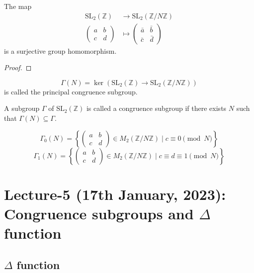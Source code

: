 \documentclass[oneside, 12pt]{scrbook}
\newcommand{\ZZ}{\mathbb Z}
\theoremstyle{theorem}
\begin{document}
\begin{lemma}
The map 
\begin{align*}
\mathrm{SL}_{2}(\ZZ) &\rightarrow \mathrm{SL}_{2}(\ZZ / N \ZZ) \\
\begin{pmatrix}
a & b \\ c & d
\end{pmatrix}  &\mapsto \begin{pmatrix}
\bar{a} & \bar{b} \\ \bar{c} & \bar{d}
\end{pmatrix}
\end{align*}
is a surjective group homomorphism.
\end{lemma}

\begin{proof}

\end{proof}

\begin{definition}
$$\Gamma (N) = \ker (\mathrm{SL}_{2}(\ZZ) \rightarrow \mathrm{SL}_{2}(\ZZ / N \ZZ))$$ is called the principal congruence subgroup.
\end{definition}

\begin{definition}
A subgroup $\Gamma$ of $\mathrm{SL}_{2}(\ZZ)$ is called a congruence subgroup if there exists $N$ such that $\Gamma (N) \subseteq \Gamma$.
\end{definition}

$$\Gamma_{0}(N) =\left\{ \begin{pmatrix}
a & b \\ c & d
\end{pmatrix} \in M_{2}(\ZZ / N \ZZ) \mid c\equiv 0 \pmod{N} \right\}$$
$$\Gamma_{1}(N) =\left\{ \begin{pmatrix}
a & b \\ c & d
\end{pmatrix} \in M_{2}(\ZZ / N \ZZ) \mid c\equiv d \equiv 1 \pmod{N} \right\}$$


\chapter{Lecture-5 (17th January, 2023): Congruence subgroups and $\Delta$ function}

\section{$\Delta$ function}
\end{document}
